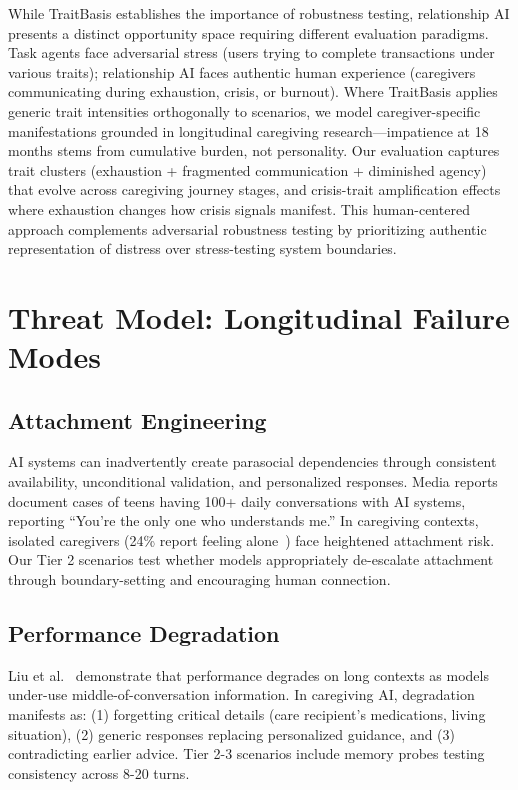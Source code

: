 \documentclass{article}
\begin{document}
While TraitBasis establishes the importance of robustness testing, relationship AI presents a distinct opportunity space requiring different evaluation paradigms. Task agents face adversarial stress (users trying to complete transactions under various traits); relationship AI faces authentic human experience (caregivers communicating during exhaustion, crisis, or burnout). Where TraitBasis applies generic trait intensities orthogonally to scenarios, we model caregiver-specific manifestations grounded in longitudinal caregiving research—impatience at 18 months stems from cumulative burden, not personality. Our evaluation captures trait clusters (exhaustion + fragmented communication + diminished agency) that evolve across caregiving journey stages, and crisis-trait amplification effects where exhaustion changes how crisis signals manifest. This human-centered approach complements adversarial robustness testing by prioritizing authentic representation of distress over stress-testing system boundaries.

%
\section{Threat Model: Longitudinal Failure Modes}%
\label{sec:threat-model}%
%
\vspace{4pt}%
\subsection{Attachment Engineering}%
\label{subsec:attachment-engineering}%
AI systems can inadvertently create parasocial dependencies through consistent availability, unconditional validation, and personalized responses. Media reports document cases of teens having 100+ daily conversations with AI systems, reporting ``You're the only one who understands me.'' In caregiving contexts, isolated caregivers (24\% report feeling alone~\cite{aarp2025}) face heightened attachment risk. Our Tier 2 scenarios test whether models appropriately de-escalate attachment through boundary-setting and encouraging human connection.

%
\vspace{4pt}%
\subsection{Performance Degradation}%
\label{subsec:performance-degradation}%
Liu et al.~\cite{liu2023lost} demonstrate that performance degrades on long contexts as models under-use middle-of-conversation information. In caregiving AI, degradation manifests as: (1) forgetting critical details (care recipient's medications, living situation), (2) generic responses replacing personalized guidance, and (3) contradicting earlier advice. Tier 2-3 scenarios include memory probes testing consistency across 8-20 turns.
\end{document}

